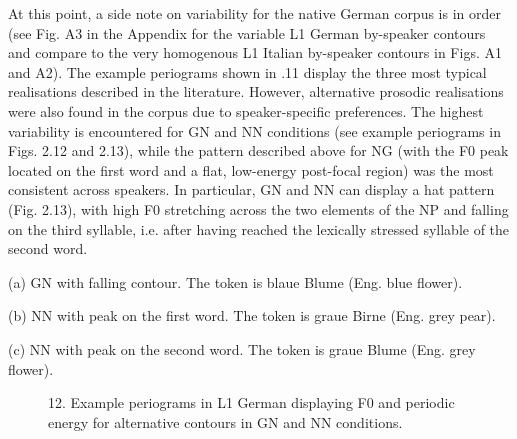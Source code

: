 At this point, a side note on variability for the native German corpus is in order (see Fig. A3 in the Appendix for the variable L1 German by-speaker contours and compare to the very homogenous L1 Italian by-speaker contours in Figs. A1 and A2). The example periograms shown in .11 display the three most typical realisations described in the literature. However, alternative prosodic realisations were also found in the corpus due to speaker-specific preferences. The highest variability is encountered for GN and NN conditions (see example periograms in Figs. 2.12 and 2.13), while the pattern described above for NG (with the F0 peak located on the first word and a flat, low-energy post-focal region) was the most consistent across speakers. In particular, GN and NN can display a hat pattern (Fig. 2.13), with high F0 stretching across the two elements of the NP and falling on the third syllable, i.e. after having reached the lexically stressed syllable of the second word.

  
 

\begin{stylecaption}
(a) GN with falling contour. The token is blaue Blume (Eng. blue flower).
\end{stylecaption}

\begin{stylecaption}
  
 
\end{stylecaption}

\begin{stylecaption}
(b) NN with peak on the first word. The token is graue Birne (Eng. grey pear).  
 
\end{stylecaption}

\begin{stylecaption}
(c) NN with peak on the second word. The token is graue Blume (Eng. grey flower).
\end{stylecaption}

\begin{stylecaption}\begin{figure}
\caption{12. Example periograms in L1 German displaying F0 and periodic energy for alternative contours in GN and NN conditions.}
\label{fig:key:2}
\end{figure}\end{stylecaption}

